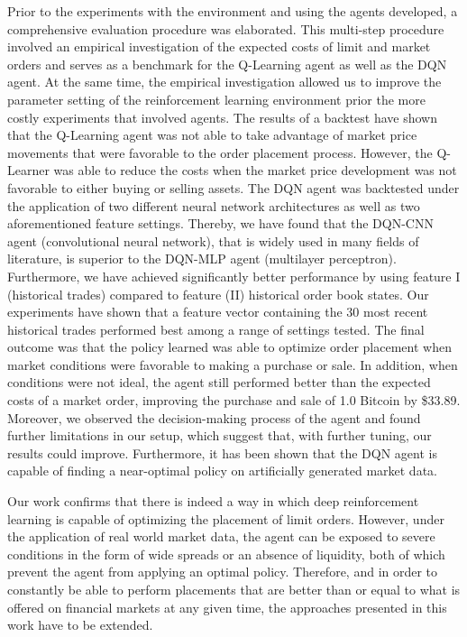 Prior to the experiments with the environment and using the agents developed, a comprehensive evaluation procedure was elaborated.
This multi-step procedure involved an empirical investigation of the expected costs of limit and market orders and serves as a benchmark for the Q-Learning agent as well as the DQN agent.
At the same time, the empirical investigation allowed us to improve the parameter setting of the reinforcement learning environment prior the more costly experiments that involved agents.
The results of a backtest have shown that the Q-Learning agent was not able to take advantage of market price movements that were favorable to the order placement process.
However, the Q-Learner was able to reduce the costs when the market price development was not favorable to either buying or selling assets.
The DQN agent was backtested under the application of two different neural network architectures as well as two aforementioned feature settings.
Thereby, we have found that the DQN-CNN agent (convolutional neural network), that is widely used in many fields of literature, is superior to the DQN-MLP agent (multilayer perceptron).
Furthermore, we have achieved significantly better performance by using feature I (historical trades) compared to feature (II) historical order book states.
Our experiments have shown that a feature vector containing the 30 most recent historical trades performed best among a range of settings tested.
The final outcome was that the policy learned was able to optimize order placement when market conditions were favorable to making a purchase or sale.
In addition, when conditions were not ideal, the agent still performed better than the expected costs of a market order, improving the purchase and sale of 1.0 Bitcoin by \$33.89.
Moreover, we observed the decision-making process of the agent and found further limitations in our setup, which suggest that, with further tuning, our results could improve.
Furthermore, it has been shown that the DQN agent is capable of finding a near-optimal policy on artificially generated market data.

Our work confirms that there is indeed a way in which deep reinforcement learning is capable of optimizing the placement of limit orders.
However, under the application of real world market data, the agent can be exposed to severe conditions in the form of wide spreads or an absence of liquidity, both of which prevent the agent from applying an optimal policy.
Therefore, and in order to constantly be able to perform placements that are better than or equal to what is offered on financial markets at any given time, the approaches presented in this work have to be extended.

